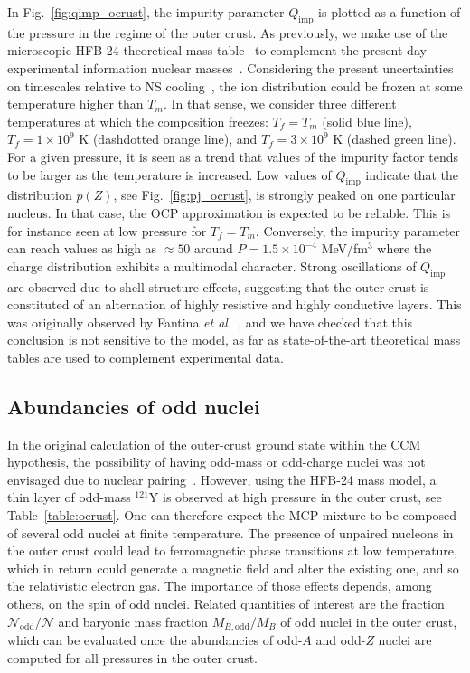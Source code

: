 In Fig.~\ref{fig:qimp_ocrust}, the impurity parameter $Q_{\text{imp}}$ is 
plotted as a function of the pressure in the regime of the outer crust. As
previously, we make use of the microscopic HFB-24 theoretical mass
table~\cite{Goriely2013} to complement the present day experimental
information nuclear masses~\cite{Huang2017,Welker2017}.
Considering the present uncertainties on timescales relative to NS 
cooling~\cite{Goriely2011}, the ion distribution could be frozen at some
temperature higher than $T_m$.
In that sense, we consider three different temperatures at which the 
composition freezes: $T_f = T_m$ (solid blue line), $T_f = 1\times 10^9$ K 
(dashdotted orange line), and $T_f = 3\times 10^9$ K (dashed green line).
For a given pressure, it is seen as a trend that values of the impurity factor
tends to be larger as the temperature is increased.
Low values of $Q_{\text{imp}}$ indicate that the distribution $p(Z)$, see
Fig.~\ref{fig:pj_ocrust}, is strongly peaked on one particular nucleus. In that 
case, the OCP approximation is expected to be reliable. This is for instance
seen at low pressure for $T_f = T_m$. Conversely, the impurity parameter 
can reach values as high as $\approx 50$ around $P=1.5\times 10^{-4}$ 
MeV/fm$^3$ where the charge distribution exhibits a multimodal 
character. 
Strong oscillations of $Q_{\text{imp}}$ are observed due to shell structure
effects, suggesting that the outer crust is constituted of an alternation of 
highly resistive and highly conductive layers. This was originally observed
by Fantina \textit{et al.}~\cite{Fantina2020}, and we have checked 
that this conclusion is not sensitive to the model, as far as state-of-the-art
theoretical mass tables are used to complement experimental data.

\subsection{Abundancies of odd nuclei}\label{subsec:odd_ocrust}

In the original calculation of the outer-crust ground state within the CCM
hypothesis, the possibility of having odd-mass or odd-charge nuclei was not 
envisaged due to nuclear pairing~\cite{BPS}.
However, using the HFB-24 mass model, a thin layer of odd-mass $^{121}$Y is 
observed at high pressure in the outer crust, see Table~\ref{table:ocrust}.
One can therefore expect the MCP mixture to be composed of several odd nuclei
at finite temperature.
%
The presence of unpaired nucleons in the outer crust could lead to
ferromagnetic phase transitions at low temperature, which in return could 
generate a magnetic field and alter the existing one, and so the relativistic
electron gas. The importance of those effects depends, among others, on the 
spin of odd nuclei.
%
Related quantities of interest are the fraction 
$\mathcal{N}_{\text{odd}}/\mathcal{N}$ and baryonic mass fraction 
$M_{B,\text{odd}}/M_B$ of odd nuclei in the outer crust, which can be evaluated 
once the abundancies of odd-$A$ and odd-$Z$ nuclei are computed for all 
pressures in the outer crust.
 
